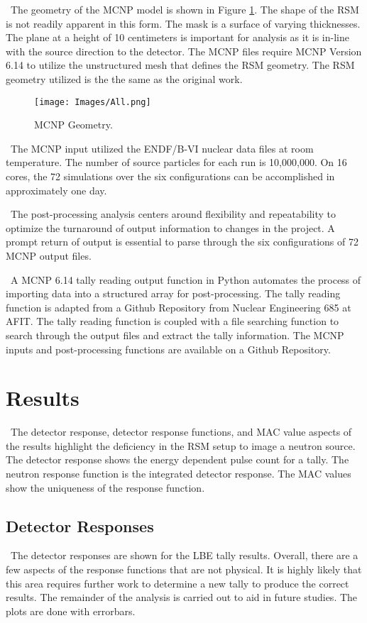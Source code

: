 \documentclass[journal]{IEEEtran}
\let\MYoriglatexcaption\caption
\renewcommand{\caption}[2][\relax]{\MYoriglatexcaption[#2]{#2}}
\begin{document}
	\ The geometry of the MCNP model is shown in Figure \ref{fig:geometry}.  The shape of the RSM is not readily apparent in this form.  The mask is a surface of varying thicknesses.  The plane at a height of 10 centimeters is important for analysis as it is in-line with the source direction to the detector.  The MCNP files require MCNP Version 6.14 to utilize the unstructured mesh that defines the RSM geometry.  The RSM geometry utilized is the the same as the original work. 
	
	\begin{figure}[ht]
		\texttt{[image: Images/All.png]}
		\caption{MCNP Geometry.}
		\label{fig:geometry}
	\end{figure}
    
    \ The MCNP input utilized the ENDF/B-VI nuclear data files at room temperature.  The number of source particles for each run is 10,000,000.  On 16 cores, the 72 simulations over the six configurations can be accomplished in approximately one day. 
    
    \ The post-processing analysis centers around flexibility and repeatability to optimize the turnaround of output information to changes in the project.  A prompt return of output is essential to parse through the six configurations of 72 MCNP output files.  
    
    \ A MCNP 6.14 tally reading output function in Python automates the process of importing data into a structured array for post-processing.  The tally reading function is adapted from a Github Repository from Nuclear Engineering 685 at AFIT\cite{N685}. The tally reading function is coupled with a file searching function to search through the output files and extract the tally information.  The MCNP inputs and post-processing functions are available on a Github Repository\cite{RSMcode}. 
   
	\section{Results}
    \ The detector response, detector response functions, and MAC value aspects of the results highlight the deficiency in the RSM setup to image a neutron source.  The detector response shows the energy dependent pulse count for a tally.  The neutron response function is the integrated detector response.  The MAC values show the uniqueness of the response function. 
      
	\subsection{Detector Responses}
    \ The detector responses are shown for the LBE tally results.  Overall, there are a few aspects of the response functions that are not physical.  It is highly likely that this area requires further work to determine a new tally to produce the correct results.  The remainder of the analysis is carried out to aid in future studies.  The plots are done with errorbars. 
    
\end{document}
